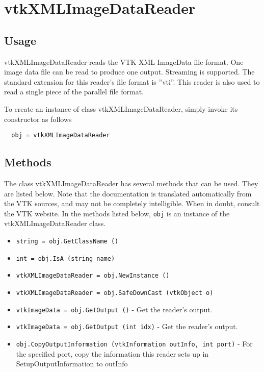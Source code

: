 \section{vtkXMLImageDataReader}

\subsection{Usage}

 vtkXMLImageDataReader reads the VTK XML ImageData file format.  One
 image data file can be read to produce one output.  Streaming is
 supported.  The standard extension for this reader's file format is
 ''vti''.  This reader is also used to read a single piece of the
 parallel file format.

To create an instance of class vtkXMLImageDataReader, simply
invoke its constructor as follows
\begin{verbatim}
  obj = vtkXMLImageDataReader
\end{verbatim}
\subsection{Methods}

The class vtkXMLImageDataReader has several methods that can be used.
  They are listed below.
Note that the documentation is translated automatically from the VTK sources,
and may not be completely intelligible.  When in doubt, consult the VTK website.
In the methods listed below, \verb|obj| is an instance of the vtkXMLImageDataReader class.
\begin{itemize}
\item  \verb|string = obj.GetClassName ()|

\item  \verb|int = obj.IsA (string name)|

\item  \verb|vtkXMLImageDataReader = obj.NewInstance ()|

\item  \verb|vtkXMLImageDataReader = obj.SafeDownCast (vtkObject o)|

\item  \verb|vtkImageData = obj.GetOutput ()| -  Get the reader's output.

\item  \verb|vtkImageData = obj.GetOutput (int idx)| -  Get the reader's output.

\item  \verb|obj.CopyOutputInformation (vtkInformation outInfo, int port)| -  For the specified port, copy the information this reader sets up in
 SetupOutputInformation to outInfo

\end{itemize}
